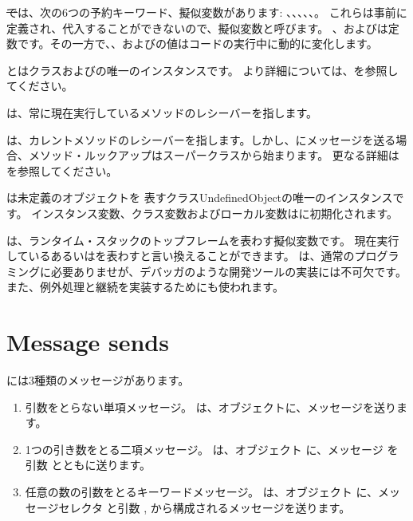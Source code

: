 \documentclass[a4paper,10pt,twoside]{book}
\begin{document}
\st では、次の6つの予約キーワード、擬似変数があります:
、、、、、。
これらは事前に定義され、代入することができないので、擬似変数と呼びます。
、およびは定数です。その一方で、、およびの値はコードの実行中に動的に変化します。

とはクラスおよびの唯一のインスタンスです。
より詳細については、を参照してください。

は、常に現在実行しているメソッドのレシーバーを指します。

は、カレントメソッドのレシーバーを指します。しかし、にメッセージを送る場合、メソッド・ルックアップはスーパークラスから始まります。
更なる詳細はを参照してください。

は未定義のオブジェクトを
表すクラスUndefinedObjectの唯一のインスタンスです。
インスタンス変数、クラス変数およびローカル変数はに初期化されます。

は、ランタイム・スタックのトップフレームを表わす擬似変数です。
現在実行しているあるいはを表わすと言い換えることができます。
は、通常のプログラミングに必要ありませが、デバッガのような開発ツールの実装には不可欠です。また、例外処理と継続を実装するためにも使われます。

\section{Message sends}

\pharo には3種類のメッセージがあります。
\begin{enumerate}
  \item 引数をとらない単項メッセージ。
  は、オブジェクトに、メッセージを送ります。
  \item 1つの引き数をとる二項メッセージ。
  	は、オブジェクト  に、メッセージ \ct{+} を引数  とともに送ります。
  \item 任意の数の引数をとるキーワードメッセージ。
  	 は、オブジェクト  に、メッセージセレクタ
	 と引数 ,  から構成されるメッセージを送ります。
\end{enumerate}
\end{document}
